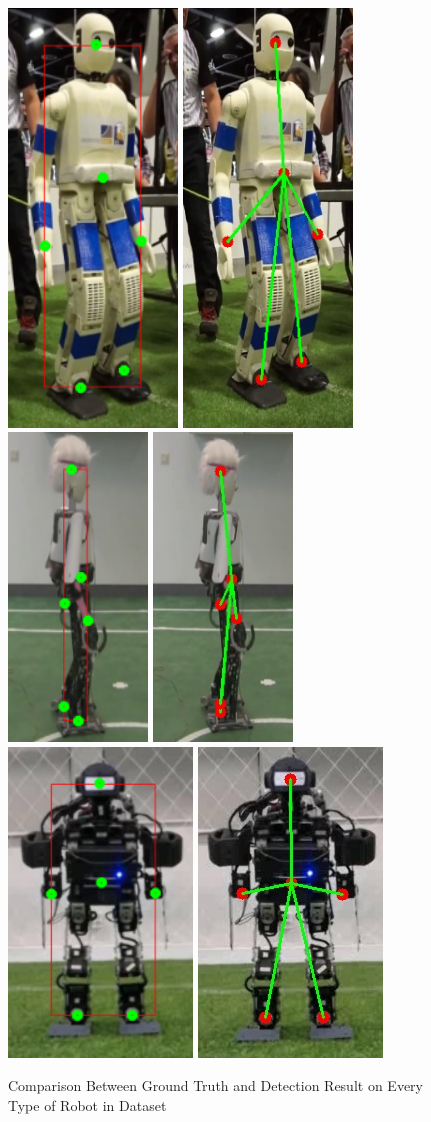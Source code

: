 \begin{figure}
  \\[\medskipamount]
  \includegraphics[width=.12\textwidth]{gambar/comp_with_gt/robot_10_gt.png}
  \includegraphics[width=.12\textwidth]{gambar/comp_with_gt/robot_10_res.png} \hfill%
  \includegraphics[width=.137\textwidth]{gambar/comp_with_gt/robot_11_gt.png}
  \includegraphics[width=.137\textwidth]{gambar/comp_with_gt/robot_11_res.png} \hfill%
  \includegraphics[width=.18\textwidth]{gambar/comp_with_gt/robot_12_gt.png}
  \includegraphics[width=.18\textwidth]{gambar/comp_with_gt/robot_12_res.png}
  \centering
  \captionsetup{justification=centering, margin=2cm}
  \caption{Comparison Between Ground Truth and Detection Result on Every Type of Robot in Dataset}
  \label{fig:comparisongtandresult}
\end{figure}